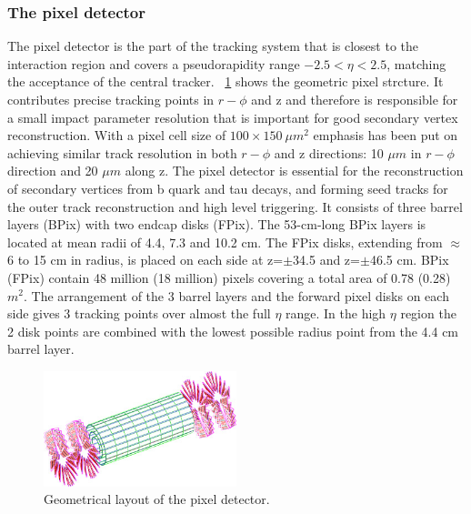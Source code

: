 \subsubsection{The pixel detector}
The pixel detector is the part of the tracking system that is closest to the interaction region and covers a pseudorapidity range $-2.5 < \eta  < 2.5$, matching the acceptance of the central tracker. \figurename~\ref{Pixel_structure} shows the geometric pixel strcture. It contributes precise tracking points in $r - \phi$ and z and therefore is responsible for a small impact parameter resolution that is important for good secondary vertex reconstruction. With a pixel cell size of $100 \times 150\ \mu m^{2}$ emphasis has been put on achieving similar track resolution in both $r-\phi$ and z directions: 10 $\mu m$ in $r - \phi$ direction and 20 $\mu m$ along z. The pixel detector is essential for the reconstruction of secondary vertices from b quark and tau decays, and forming seed tracks for the outer track reconstruction and high level triggering. It consists of three barrel layers (BPix) with two endcap disks (FPix). The 53-cm-long BPix layers is located at mean radii of 4.4, 7.3 and 10.2 cm. The FPix disks, extending from $\approx$ 6 to 15 cm in radius, is placed on each side at z=$\pm$34.5 and z=$\pm$46.5 cm. BPix (FPix) contain 48 million (18 million) pixels covering a total area of 0.78 (0.28) $m^{2}$. The arrangement of the 3 barrel layers and the forward pixel disks on each side gives 3 tracking points over almost the full $\eta$ range. In the high $\eta$ region the 2 disk points are combined with the lowest possible radius point from the 4.4 cm barrel layer.
\begin{figure}[htbp]
\centering
\includegraphics[width=0.5\textwidth]{Images/Pixel_structure}
\caption{Geometrical layout of the pixel detector.}
\label{Pixel_structure}
\end{figure}

